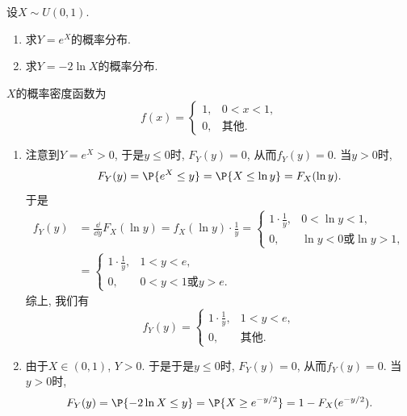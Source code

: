 \documentclass[11pt]{ctexart}
\begin{document}
\begin{example}
	设$X \sim U(0,1)$. 
	\begin{enumerate}
		\item 求$Y = e^X$的概率分布. 
		\item 求$Y = -2 \ln X$的概率分布. 
	\end{enumerate}
\end{example}
\begin{solution}
	$X$的概率密度函数为
	\begin{equation*}
		f(x) = 
			\begin{cases}
				1, & 0<x<1, \\ 0, &\text{其他}. 
			\end{cases}
	\end{equation*}
	\begin{enumerate}
		\item 注意到$Y = e^X > 0$, 于是$y \leq 0$时, $F_Y(y) = 0$, 从而$f_Y(y) = 0$. 
			当$y > 0$时, 
			\begin{equation*}
				F_Y(y) 
				= \P\{e^X \leq y\} 
				= \P\{X \leq \ln y\}
				= F_X(\ln y). 
			\end{equation*}
			于是
			\begin{align*}
				f_Y(y) 
				&= \frac{\dd}{\dd y} F_X(\ln y)
				= f_X(\ln y) \cdot \frac{1}{y}
				= \begin{cases}
					1 \cdot \frac{1}{y}, & 0 < \ln y < 1, \\ 0, &\ln y < 0 \text{或} \ln y > 1, 
				\end{cases} \\
				&= \begin{cases}
					1 \cdot \frac{1}{y}, & 1 < y < e, \\ 0, &0 < y < 1 \text{或}  y > e.  
				\end{cases}
			\end{align*}
			综上, 我们有
			\begin{equation*}
				f_Y(y) 
				= \begin{cases}
					1 \cdot \frac{1}{y}, & 1 < y < e, \\ 0, &\text{其他}.  
				\end{cases}
			\end{equation*}
		\item 由于$X \in (0,1)$, $Y > 0$. 于是于是$y \leq 0$时, $F_Y(y) = 0$, 从而$f_Y(y) = 0$. 
			当$y > 0$时, 
			\begin{align*}
				F_Y(y)
				= \P\{-2 \ln X \leq y\}
				= \P\{X \geq e^{-y / 2}\}
				= 1 - F_X(e^{-y / 2}). 
			\end{align*}

\end{enumerate}
\end{solution}
\end{document}
